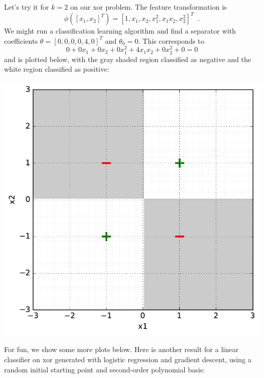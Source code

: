 Let's try it for $k = 2$ on our {\sc xor} problem.  The feature
transformation is
\[\phi([x_1, x_2]^T) = [1, x_1, x_2, x_1^2, x_1 x_2, x_2^2]^T\;\;.\]
We might run a classification learning algorithm and find a separator
with coefficients $\theta = [0, 0, 0, 0, 4, 0]^T$ and $\theta_0 = 0$.
This corresponds to
\[0 + 0 x_1 + 0 x_2 + 0 x_1^2 + 4 x_1 x_2 + 0x_2^2 + 0 = 0\]
and is plotted below, with the gray shaded region classified as
negative and the white region classified as positive:
\begin{examplebox}
  \begin{center}
    \includegraphics[scale=0.48]{figures/feature_representation_xor_sign.pdf}
  \end{center}
\end{examplebox}

For fun, we show some more plots below.  Here is another result for a
linear classifier on {\sc xor} generated with logistic regression and
gradient descent, using a random initial starting point and second-order
polynomial basis:

